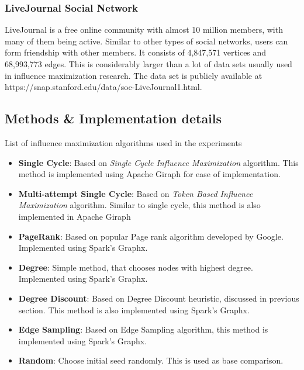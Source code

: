 \documentclass[english]{tktltiki}
\begin{document}
\subsubsection{LiveJournal Social Network}
LiveJournal is a free online community with almost 10 million members, with many of them being active. 
Similar to other types of social networks, users can form friendship with other members. 
It consists of 4,847,571 vertices and 68,993,773 edges. 
This is considerably larger than a lot of data sets usually used in influence maximization research. 
The data set is publicly available at https://snap.stanford.edu/data/soc-LiveJournal1.html. 

\subsection{Methods \& Implementation details}
List of influence maximization algorithms used in the experiments
\begin{itemize}
\item \textbf{Single Cycle}: Based on \textit{Single Cycle Influence Maximization} algorithm. 
This method is implemented using Apache Giraph for ease of implementation.
\item \textbf{Multi-attempt Single Cycle}: Based on \textit{Token Based Influence Maximization} algorithm. 
Similar to single cycle, this method is also implemented in Apache Giraph
\item \textbf{PageRank}: Based on popular Page rank algorithm developed by Google. 
Implemented using Spark's Graphx.
\item \textbf{Degree}: Simple method, that chooses nodes with highest degree. 
Implemented using Spark's Graphx.
\item \textbf{Degree Discount}: Based on Degree Discount heuristic, discussed in previous section. 
This method is also implemented using Spark's Graphx.
\item \textbf{Edge Sampling}: Based on Edge Sampling algorithm, this method is implemented using Spark's Graphx.
\item \textbf{Random}: Choose initial seed randomly. 
This is used as base comparison. 
\end{itemize}
\end{document}
